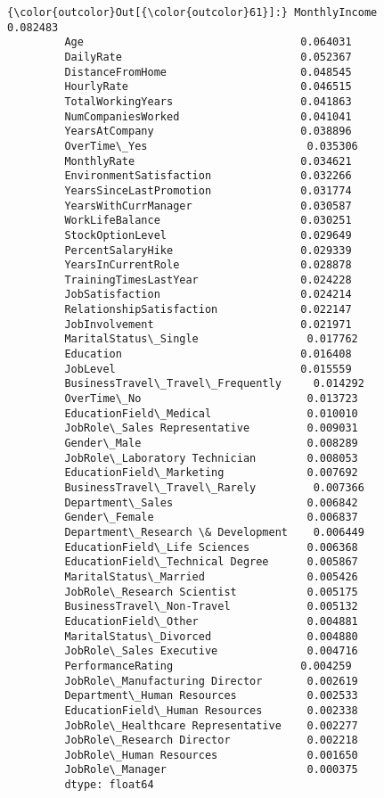 \documentclass[11pt]{article}
\begin{document}
\begin{Verbatim}[commandchars=\\\{\}]
{\color{outcolor}Out[{\color{outcolor}61}]:} MonthlyIncome                        0.082483
         Age                                  0.064031
         DailyRate                            0.052367
         DistanceFromHome                     0.048545
         HourlyRate                           0.046515
         TotalWorkingYears                    0.041863
         NumCompaniesWorked                   0.041041
         YearsAtCompany                       0.038896
         OverTime\_Yes                         0.035306
         MonthlyRate                          0.034621
         EnvironmentSatisfaction              0.032266
         YearsSinceLastPromotion              0.031774
         YearsWithCurrManager                 0.030587
         WorkLifeBalance                      0.030251
         StockOptionLevel                     0.029649
         PercentSalaryHike                    0.029339
         YearsInCurrentRole                   0.028878
         TrainingTimesLastYear                0.024228
         JobSatisfaction                      0.024214
         RelationshipSatisfaction             0.022147
         JobInvolvement                       0.021971
         MaritalStatus\_Single                 0.017762
         Education                            0.016408
         JobLevel                             0.015559
         BusinessTravel\_Travel\_Frequently     0.014292
         OverTime\_No                          0.013723
         EducationField\_Medical               0.010010
         JobRole\_Sales Representative         0.009031
         Gender\_Male                          0.008289
         JobRole\_Laboratory Technician        0.008053
         EducationField\_Marketing             0.007692
         BusinessTravel\_Travel\_Rarely         0.007366
         Department\_Sales                     0.006842
         Gender\_Female                        0.006837
         Department\_Research \& Development    0.006449
         EducationField\_Life Sciences         0.006368
         EducationField\_Technical Degree      0.005867
         MaritalStatus\_Married                0.005426
         JobRole\_Research Scientist           0.005175
         BusinessTravel\_Non-Travel            0.005132
         EducationField\_Other                 0.004881
         MaritalStatus\_Divorced               0.004880
         JobRole\_Sales Executive              0.004716
         PerformanceRating                    0.004259
         JobRole\_Manufacturing Director       0.002619
         Department\_Human Resources           0.002533
         EducationField\_Human Resources       0.002338
         JobRole\_Healthcare Representative    0.002277
         JobRole\_Research Director            0.002218
         JobRole\_Human Resources              0.001650
         JobRole\_Manager                      0.000375
         dtype: float64
\end{Verbatim}
            
\end{document}
